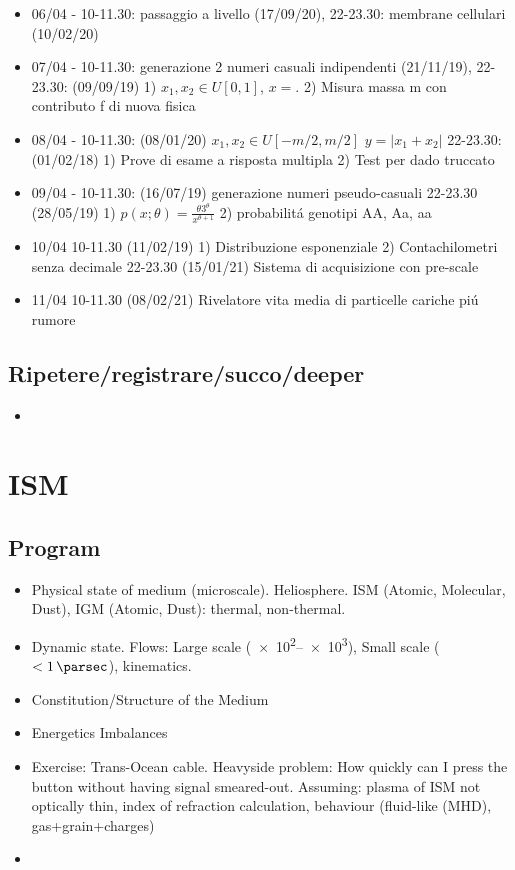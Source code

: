 \documentclass[10pt,xcolor={usenames},fleqn,mathserif,serif]{beamer}
\begin{document}
\begin{itemize}
    \item 06/04 - 10-11.30: passaggio a livello (17/09/20), 22-23.30: membrane cellulari (10/02/20)
    \item 07/04 - 10-11.30: generazione 2 numeri casuali indipendenti (21/11/19), 22-23.30: (09/09/19) 1) $x_1, x_2\in U[0,1]$, $x=$. 2) Misura massa m con contributo f di nuova fisica
    \item 08/04 - 10-11.30: (08/01/20) $x_1,x_2\in U[-m/2,m/2]$ $y=|x_1+x_2|$ 22-23.30: (01/02/18) 1) Prove di esame a risposta multipla 2) Test per dado truccato
    \item 09/04 - 10-11.30: (16/07/19) generazione numeri pseudo-casuali 22-23.30 (28/05/19) 1) $p(x;\theta)=\frac{\theta3^{\theta}}{x^{\theta+1}}$ 2) probabilit\'a genotipi AA, Aa, aa
    \item 10/04 10-11.30 (11/02/19) 1) Distribuzione esponenziale 2) Contachilometri senza decimale 22-23.30 (15/01/21) Sistema di acquisizione con pre-scale 
    \item 11/04 10-11.30 (08/02/21) Rivelatore vita media di particelle cariche pi\'u rumore
\end{itemize}

\subsection{Ripetere/registrare/succo/deeper}

\begin{itemize}
    \item 
\end{itemize}

\section{ISM}

\subsection{Program}

\begin{itemize}
    \item Physical state of medium (microscale). Heliosphere. ISM (Atomic, Molecular, Dust), IGM (Atomic, Dust): thermal, non-thermal.
    \item Dynamic state. Flows: Large scale (\SIrange{e2}{e3}{\parsec}), Small scale ($<\SI{1}{\parsec}$), kinematics.
    \item Constitution/Structure of the Medium
    \item Energetics Imbalances
\end{itemize}

\begin{itemize}
    \item Exercise: Trans-Ocean cable. Heavyside problem: How quickly can I press the button without having signal smeared-out.
    Assuming: plasma of ISM not optically thin, index of refraction calculation, behaviour (fluid-like (MHD), gas+grain+charges)
    \item 
\end{itemize}
\end{document}
